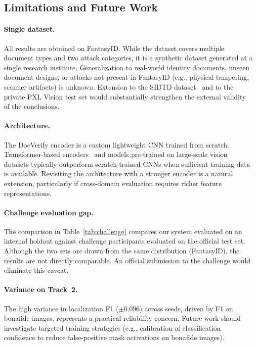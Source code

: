 \subsection{Limitations and Future Work}

\paragraph{Single dataset.}
All results are obtained on FantasyID. While the dataset covers multiple document
types and two attack categories, it is a synthetic dataset generated at a single
research institute. Generalization to real-world identity documents, unseen
document designs, or attacks not present in FantasyID (e.g., physical tampering,
scanner artifacts) is unknown. Extension to the SIDTD
dataset~\cite{TODO_sidtd} and to the private PXL Vision test set would
substantially strengthen the external validity of the conclusions.

\paragraph{Architecture.}
The DocVerify encoder is a custom lightweight CNN trained from scratch. Transformer-based
encoders~\cite{TODO_vit} and models pre-trained on large-scale vision datasets
typically outperform scratch-trained CNNs when sufficient training data is
available. Revisiting the architecture with a stronger encoder is a natural
extension, particularly if cross-domain evaluation requires richer feature representations.

\paragraph{Challenge evaluation gap.}
The comparison in Table~\ref{tab:challenge} compares our system evaluated on an
internal holdout against challenge participants evaluated on the official test set.
Although the two sets are drawn from the same distribution (FantasyID), the results
are not directly comparable. An official submission to the challenge would
eliminate this caveat.

\paragraph{Variance on Track~2.}
The high variance in localization F1 ($\pm 0.096$) across seeds, driven by F1 on
bonafide images, represents a practical reliability concern. Future work should
investigate targeted training strategies (e.g., calibration of classification
confidence to reduce false-positive mask activations on bonafide images).
